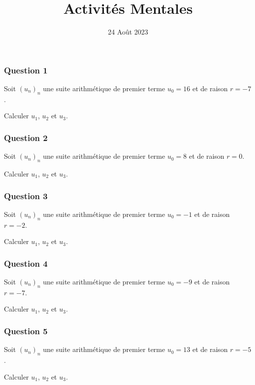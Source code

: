 \documentclass[15pt, mathserif]{beamer}
\title{Activités Mentales}
\date{24 Août 2023}
\begin{document}
\begin{frame}
    \titlepage
\end{frame}

\begin{frame} 
	\frametitle{Question 1}
Soit $(u_n)_n$ une suite arithmétique de premier terme $u_0=16$ et de raison $r=-7$. 
 
 Calculer $u_1$, $u_2$ et $u_3$.\end{frame}


\begin{frame} 
	\frametitle{Question 2}
Soit $(u_n)_n$ une suite arithmétique de premier terme $u_0=8$ et de raison $r=0$. 
 
 Calculer $u_1$, $u_2$ et $u_3$.\end{frame}


\begin{frame} 
	\frametitle{Question 3}
Soit $(u_n)_n$ une suite arithmétique de premier terme $u_0=-1$ et de raison $r=-2$. 
 
 Calculer $u_1$, $u_2$ et $u_3$.\end{frame}


\begin{frame} 
	\frametitle{Question 4}
Soit $(u_n)_n$ une suite arithmétique de premier terme $u_0=-9$ et de raison $r=-7$. 
 
 Calculer $u_1$, $u_2$ et $u_3$.\end{frame}


\begin{frame} 
	\frametitle{Question 5}
Soit $(u_n)_n$ une suite arithmétique de premier terme $u_0=13$ et de raison $r=-5$. 
 
 Calculer $u_1$, $u_2$ et $u_3$.\end{frame}
\end{document}
